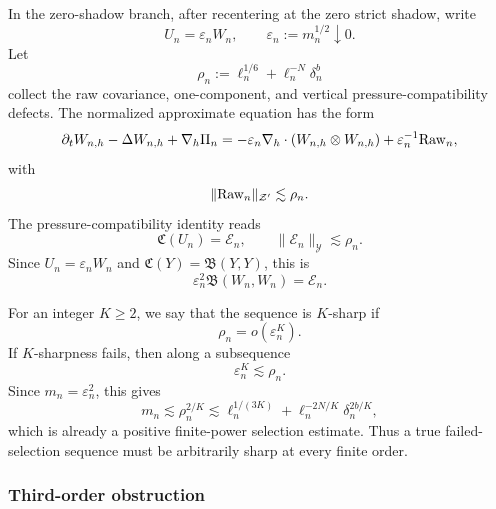 \documentclass[11pt]{article}
\numberwithin{equation}{section}
\theoremstyle{plain}
\theoremstyle{definition}
\theoremstyle{remark}
\newcommand{\eps}{\varepsilon}
\newcommand{\nabh}{\nabla_h}
\newcommand{\calB}{\mathfrak B}
\newcommand{\calC}{\mathfrak C}
\newcommand{\calY}{\mathcal Y}
\newcommand{\calZ}{\mathcal Z}
\begin{document}
In the zero-shadow branch, after recentering at the zero strict shadow, write
\begin{equation}\label{pIII:eq:zero-normalized-seq}
        U_n=\eps_nW_n,
        \qquad
        \eps_n:=m_n^{1/2}\downarrow0.
\end{equation}
Let
\begin{equation}\label{pIII:eq:rho-def}
        \rho_n:=\ell_n^{1/6}+\ell_n^{-N}\delta_n^b
\end{equation}
collect the raw covariance, one-component, and vertical pressure-compatibility defects.
The normalized approximate equation has the form
\begin{equation}\label{pIII:eq:Wn-normalized}
        \partial_tW_{n,h}-\Delta W_{n,h}+\nabh\Pi_n
        =
        -\eps_n\nabh\cdot(W_{n,h}\otimes W_{n,h})
        +\eps_n^{-1}{\rm Raw}_n,
\end{equation}
with
\begin{equation}\label{pIII:eq:raw-bound}
        \|{\rm Raw}_n\|_{\calZ'}\lesssim \rho_n.
\end{equation}
The pressure-compatibility identity reads
\begin{equation}\label{pIII:eq:compatibility-seq}
        \calC(U_n)=\mathcal E_n,
        \qquad
        \|\mathcal E_n\|_{\calY}\lesssim \rho_n.
\end{equation}
Since \(U_n=\eps_nW_n\) and \(\calC(Y)=\calB(Y,Y)\), this is
\begin{equation}\label{pIII:eq:B-Wn-seq}
        \eps_n^2\calB(W_n,W_n)=\mathcal E_n.
\end{equation}

For an integer \(K\ge2\), we say that the sequence is \(K\)-sharp if
\begin{equation}\label{pIII:eq:K-sharp}
        \rho_n=o(\eps_n^K).
\end{equation}
If \(K\)-sharpness fails, then along a subsequence
\[
        \eps_n^K\lesssim \rho_n.
\]
Since \(m_n=\eps_n^2\), this gives
\begin{equation}\label{pIII:eq:finite-power-from-failed-sharpness}
        m_n\lesssim \rho_n^{2/K}
        \lesssim
        \ell_n^{1/(3K)}+\ell_n^{-2N/K}\delta_n^{2b/K},
\end{equation}
which is already a positive finite-power selection estimate.  Thus a true failed-selection
sequence must be arbitrarily sharp at every finite order.

\subsubsection{Third-order obstruction}
\end{document}
